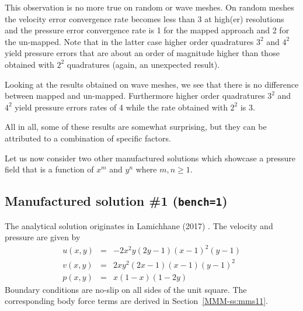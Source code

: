 This observation is no more true on random or wave meshes. 
On random meshes the velocity error convergence rate becomes less than 3 
at high(er) resolutions and the pressure error convergence rate is 1
for the mapped approach and 2 for the un-mapped. 
Note that in the latter case higher order quadratures $3^2$ and $4^2$ yield pressure errors
that are about an order of magnitude higher than those obtained with $2^2$ 
quadratures (again, an unexpected result).

Looking at the results obtained on wave meshes, we see that there is no difference between 
mapped and un-mapped. Furthermore higher order quadratures $3^2$ and $4^2$ yield pressure errors rates 
of 4 while the rate obtained with $2^2$ is 3.

All in all, some of these results are somewhat surprising, but they can be attributed to 
a combination of specific factors.

Let us now consider two other manufactured solutions which showcase a pressure field 
that is a function of $x^m$ and $y^n$ where $m,n\ge 1$.



\newpage
\subsection*{Manufactured solution \#1 ({\tt bench=1})}

The analytical solution originates in Lamichhane (2017) \cite{lami17}.
The velocity and pressure are given by
\begin{eqnarray}
u(x,y)&=&-2x^2y(2y-1)(x-1)^2(y-1) \\
v(x,y)&=& 2xy^2(2x-1)(x-1)(y-1)^2 \\
p(x,y)&=& x(1-x)(1-2y)
\end{eqnarray}
Boundary conditions are no-slip on all sides of the unit square. 
The corresponding body force terms are derived in Section~\ref{MMM-ss:mms11}. 

